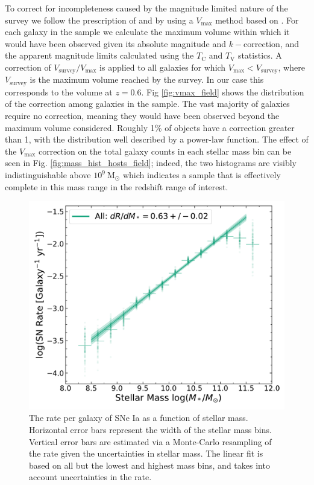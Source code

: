 \documentclass[fleqn,usenatbib]{mnras}
\begin{document}
To correct for incompleteness caused by the magnitude limited nature of the survey we follow the prescription of \citet{Sullivan2006} and \citet{Smith2012} by using a $V_{\mathrm{max}}$ method based on \citet{Schmidt1968}. For each galaxy in the sample we calculate the maximum volume within which it would have been observed given its absolute magnitude and $k-$correction, and the apparent magnitude limits calculated using the $T_{\mathrm{C}}$ and $T_{\mathrm{V}}$ statistics. A correction of $V_{\mathrm{survey}}/V_{\mathrm{max}}$ is applied to all galaxies for which $V_{\mathrm{max}} < V_{\mathrm{survey}}$, where $V_{\mathrm{survey}}$ is the maximum volume reached by the survey. In our case this corresponds to the volume at $z=0.6$. Fig \ref{fig:vmax_field} shows the distribution of the correction among galaxies in the sample. The vast majority of galaxies require no correction, meaning they would have been observed beyond the maximum volume considered. Roughly 1\% of objects have a correction greater than 1, with the distribution well described by a power-law function. The effect of the $V_{\mathrm{max}}$ correction on the total galaxy counts in each stellar mass bin can be seen in Fig. \ref{fig:mass_hist_hosts_field}; indeed, the two histograms are visibly indistinguishable above $10^9~\mathrm{M}_{\odot}$ which indicates a sample that is effectively complete in this mass range in the redshift range of interest.



\begin{figure}
    \centering
    \includegraphics[width=.5\textwidth]{figs/rate_vs_mass_all.pdf}
    \caption{The rate per galaxy of SNe Ia as a function of stellar mass. Horizontal error bars represent the width of the stellar mass bins. Vertical error bars are estimated via a Monte-Carlo resampling of the rate given the uncertainties in stellar mass. The linear fit is based on all but the lowest and highest mass bins, and takes into account uncertainties in the rate.}%
    \label{fig:rate_raw}
\end{figure}
\end{document}
